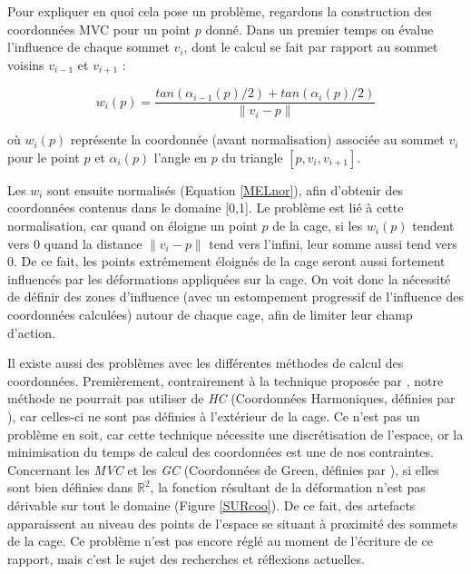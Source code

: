 Pour expliquer en quoi cela pose un problème, regardons la
construction des coordonnées MVC pour un point $p$ donné. Dans un
premier temps on évalue l'influence de chaque sommet $v_i$, dont le
calcul se fait par rapport au sommet voisins $v_{i-1}$ et $v_{i+1}$ :

\begin{equation}
  w_i(p) = \frac{tan(\alpha_{i-1}(p)/2) + tan(\alpha_{i}(p)/2)}{\|v_i - p\|}
\end{equation}

où $w_i(p)$ représente la coordonnée (avant normalisation) associée au
sommet $v_i$ pour le point $p$ et $\alpha_i(p)$ l'angle en $p$ du
triangle $[p,v_i,v_{i+1}]$.

Les $w_i$ sont ensuite normalisés (Equation \ref{MELnor}), afin
d'obtenir des coordonnées contenus dans le domaine [0,1]. Le problème
est lié à cette normalisation, car quand on éloigne un point $p$ de la
cage, si les $w_i(p)$ tendent vers 0 quand la distance $\|v_i - p\|$
tend vers l'infini, leur somme aussi tend vers 0. De ce fait, les
points extrémement éloignés de la cage seront aussi fortement
influencés par les déformations appliquées sur la cage. On voit donc
la nécessité de définir des zones d'influence (avec un estompement
progressif de l'influence des coordonnées calculées) autour de chaque
cage, afin de limiter leur champ d'action.

Il existe aussi des problèmes avec les différentes méthodes de calcul
des coordonnées. Premièrement, contrairement à la technique proposée
par \cite{GPCP13}, notre méthode ne pourrait pas utiliser de
\textit{HC} (Coordonnées Harmoniques, définies par \cite{JMDGS07}),
car celles-ci ne sont pas définies à l'extérieur de la cage. Ce n'est
pas un problème en soit, car cette technique nécessite une
discrétisation de l'espace, or la minimisation du temps de calcul des coordonnées est
une de nos contraintes. Concernant les \textit{MVC} et les \textit{GC}
(Coordonnées de Green, définies par \cite{LLC08}), si elles sont bien
définies dans $\mathbb{R}^2$, la fonction résultant de la déformation
n'est pas dérivable sur tout le domaine (Figure \ref{SURcoo}). De ce
fait, des artefacts apparaissent au niveau des points de l'espace se
situant à proximité des sommets de la cage. Ce problème n'est pas
encore réglé au moment de l'écriture de ce rapport, mais c'est le
sujet des recherches et réflexions actuelles.

